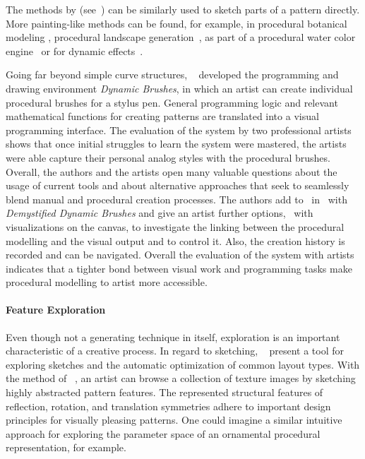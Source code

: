 The methods by \cite{gieseke_2017_ooo, kazi_2012_vit, xing_2014_apr, xing_2015_aha} (see~) can be similarly used to sketch parts of a pattern directly. More painting-like methods can be found, for example, in procedural botanical modeling \cite{anastacio_2008_spl,chen_2008_stm,palubicki_2009_sot}, procedural landscape generation~\cite{emilien_2015_wie}, as part of a procedural water color engine~\cite{diverdi_2013_ppp} or for dynamic effects~\cite{xing_2016_eit}. 


Going far beyond simple curve structures, \citeauthor*{jacobs_2018_dbe}~\cite{jacobs_2018_dbe} developed the programming and drawing environment \textit{Dynamic Brushes}, in which an artist can create individual procedural brushes for a stylus pen. General programming logic and relevant mathematical functions for creating patterns are translated into a visual programming interface. The evaluation of the system by two professional artists shows that once initial struggles to learn the system were mastered, the artists were able capture their personal analog styles with the procedural brushes. Overall, the authors and the artists open many valuable questions about the usage of current tools and about alternative approaches that seek to seamlessly blend manual and procedural creation processes. The authors add to~\cite{jacobs_2018_dbe} in~\cite{li_2020_sva} with \textit{Demystified Dynamic Brushes} and give an artist further options, \eg~with visualizations on the canvas, to investigate the linking between the procedural modelling and the visual output and to control it. Also, the creation history is recorded and can be navigated. Overall the evaluation of the system with artists indicates that a tighter bond between visual work and programming tasks make procedural modelling to artist more accessible.


\paragraph*{Feature Exploration}
\label{para:analysis_rulebased_exploration}

Even though not a generating technique in itself, exploration is an important characteristic of a creative process. In regard to sketching, \citeauthor*{todi_2016_sse}~\cite{todi_2016_sse} present a tool for exploring sketches and the automatic optimization of common layout types. With the method of \citeauthor*{chen_2016_msi}~\cite{chen_2016_msi}, an artist can browse a collection of texture images by sketching highly abstracted pattern features. The represented structural features of reflection, rotation, and translation symmetries adhere to important design principles for visually pleasing patterns. One could imagine a similar intuitive approach for exploring the parameter space of an ornamental procedural representation, for example.

